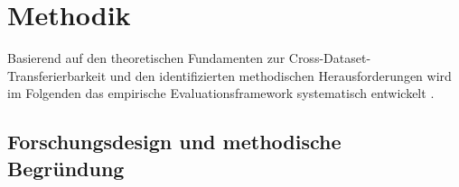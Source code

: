 \documentclass[11pt,a4paper]{article}
\begin{document}
    \section{Methodik}

    Basierend auf den theoretischen Fundamenten zur Cross-Dataset-Transferierbarkeit und den identifizierten methodischen Herausforderungen wird im Folgenden das empirische Evaluationsframework systematisch entwickelt \parencite{Weirauch2025}.

    \subsection{Forschungsdesign und methodische Begründung}
\end{document}
